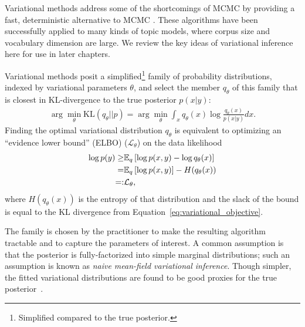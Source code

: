 Variational methods address some of the shortcomings of MCMC by
providing a fast, deterministic alternative to MCMC
\citep{jordan:2003,jordan:1999}. These algorithms have been
successfully applied to many kinds of topic models, where corpus size
and vocabulary dimension are large.  We review the key ideas of
variational inference here for use in later chapters.

Variational methods posit a simplified\footnote{Simplified compared to
  the true posterior.} family of probability distributions, indexed by
variational parameters $\theta$, and select the member $q_\theta$ of
this family that is closest in KL-divergence to the true posterior
$p(x | y)$:
\begin{align}
  \arg \min_{\theta} \mbox{KL}(q_\theta || p) = \arg \min_{\theta} \int_x q_\theta(x) \log \frac{q_\theta(x)}{p(x | y)} dx.
  \label{eq:variational_objective}
\end{align}
Finding the optimal variational distribution $q_\theta$ is equivalent
to optimizing an ``evidence lower bound'' (ELBO) ($\mathcal{L}_\theta$) on
the data likelihood
\begin{eqnarray}
  \log p(y) \ge & \mathbb{E}_q\left[\log p(x, y) - \log q_\theta(x)\right] \\
  = & \mathbb{E}_q\left[\log p(x, y)\right] - H(q_\theta(x)) \\
  =:&  \mathcal{L}_\theta,
  \label{eq:traditional_variational_objective}
\end{eqnarray}
where $H(q_\theta(x))$ is the entropy of that distribution and the
slack of the bound is equal to the KL divergence from
Equation~\ref{eq:variational_objective}.

The family is chosen by the practitioner to make the resulting
algorithm tractable and to capture the parameters of interest. A
common assumption is that the posterior is fully-factorized into
simple marginal distributions; such an assumption is known as
\emph{naive mean-field variational inference}. Though simpler, the
fitted variational distributions are found to be good proxies for the
true posterior~\citep{jordan:1999,gerrish:2011}.

